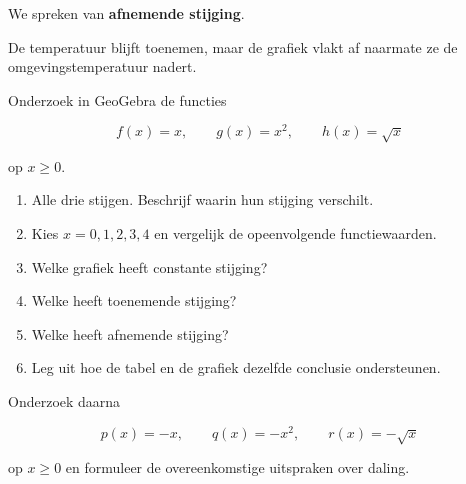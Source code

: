 \documentclass{ximera}
\begin{document}
We spreken van \textbf{afnemende stijging}.

\begin{center}
\end{center}

De temperatuur blijft toenemen, maar de grafiek vlakt af naarmate ze
de omgevingstemperatuur nadert.




\begin{geogebra}
Onderzoek in GeoGebra de functies

\[
f(x)=x,\qquad
g(x)=x^2,\qquad
h(x)=\sqrt{x}
\]

op \(x\geq 0\).

\begin{enumerate}
  \item Alle drie stijgen. Beschrijf waarin hun stijging verschilt.
  \item Kies \(x=0,1,2,3,4\) en vergelijk de opeenvolgende functiewaarden.
  \item Welke grafiek heeft constante stijging?
  \item Welke heeft toenemende stijging?
  \item Welke heeft afnemende stijging?
  \item Leg uit hoe de tabel en de grafiek dezelfde conclusie ondersteunen.
\end{enumerate}

Onderzoek daarna

\[
p(x)=-x,\qquad
q(x)=-x^2,\qquad
r(x)=-\sqrt{x}
\]

op \(x\geq0\) en formuleer de overeenkomstige uitspraken over daling.

\end{geogebra}
\end{document}
